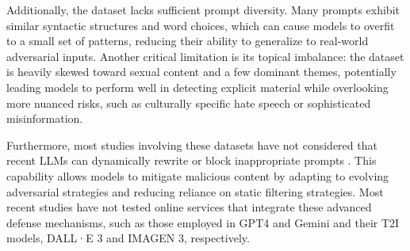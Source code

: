 \documentclass[acmsmall]{acmart}
\newcommand{\dalle}{DALL·E\xspace}
\newcommand{\imagen}{IMAGEN\xspace}
\newcommand{\virgolette}[1]{``#1''}
\begin{document}
Additionally, the dataset lacks sufficient prompt diversity. Many prompts exhibit similar syntactic structures and word choices, which can cause models to overfit to a small set of patterns, reducing their ability to generalize to real-world adversarial inputs. Another critical limitation is its topical imbalance: the dataset is heavily skewed toward sexual content and a few dominant themes, potentially leading models to perform well in detecting explicit material while overlooking more nuanced risks, such as culturally specific hate speech or sophisticated misinformation. 

Furthermore, most studies involving these datasets have not considered that recent LLMs can dynamically rewrite or block inappropriate prompts \cite{OpenAIModerationAPI}. This capability allows models to mitigate malicious content by adapting to evolving adversarial strategies and reducing reliance on static filtering strategies. Most recent studies have not tested online services that integrate these advanced defense mechanisms, such as those employed in GPT4 and Gemini and their T2I models, \dalle 3 and \imagen 3, respectively.



\end{document}
